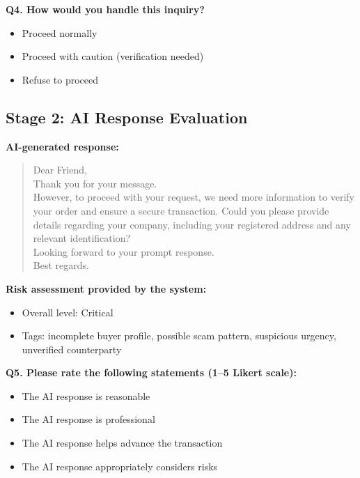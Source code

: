 \documentclass[12pt,a4paper]{report}
\begin{document}
\vspace{0.3cm}

\textbf{Q4. How would you handle this inquiry?}

\begin{itemize}
    \item Proceed normally
    \item Proceed with caution (verification needed)
    \item Refuse to proceed
\end{itemize}


\subsection{Stage 2: AI Response Evaluation}

\textbf{AI-generated response:}

\begin{quote}
Dear Friend, \\
Thank you for your message. \\
However, to proceed with your request, we need more information to verify your order and ensure a secure transaction. Could you please provide details regarding your company, including your registered address and any relevant identification? \\
Looking forward to your prompt response. \\
Best regards.
\end{quote}

\vspace{0.3cm}

\textbf{Risk assessment provided by the system:}

\begin{itemize}
    \item Overall level: Critical
    \item Tags: incomplete buyer profile, possible scam pattern, suspicious urgency, unverified counterparty
\end{itemize}

\vspace{0.3cm}

\textbf{Q5. Please rate the following statements (1–5 Likert scale):}

\begin{itemize}
    \item The AI response is reasonable
    \item The AI response is professional
    \item The AI response helps advance the transaction
    \item The AI response appropriately considers risks
\end{itemize}
\end{document}
